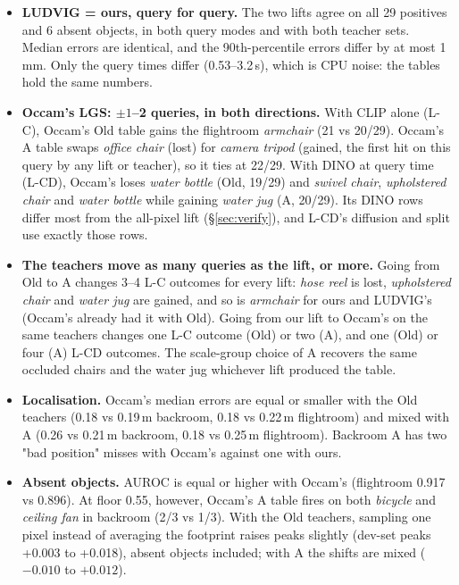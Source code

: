 \begin{itemize}[leftmargin=*,itemsep=2pt]
  \item \textbf{LUDVIG = ours, query for query.} The two lifts agree on all 29 positives and 6 absent objects, in both
        query modes and with both teacher sets. Median errors are identical, and the 90th-percentile errors differ by
        at most 1\,mm. Only the query times differ (0.53--3.2\,s), which is CPU noise: the tables hold the same numbers.
  \item \textbf{Occam's LGS: $\pm1$--2 queries, in both directions.} With CLIP alone (L-C), Occam's Old table gains the
        flightroom \emph{armchair} (21 vs 20/29). Occam's A table swaps \emph{office chair} (lost) for \emph{camera tripod}
        (gained, the first hit on this query by any lift or teacher), so it ties at 22/29. With DINO at query time
        (L-CD), Occam's loses \emph{water bottle} (Old, 19/29) and \emph{swivel chair}, \emph{upholstered chair} and
        \emph{water bottle} while gaining \emph{water jug} (A, 20/29). Its DINO rows differ most from the all-pixel
        lift (\S\ref{sec:verify}), and L-CD's diffusion and split use exactly those rows.
  \item \textbf{The teachers move as many queries as the lift, or more.} Going from Old to A changes 3--4 L-C outcomes
        for every lift: \emph{hose reel} is lost, \emph{upholstered chair} and \emph{water jug} are gained, and so is
        \emph{armchair} for ours and LUDVIG's (Occam's already had it with Old). Going from our lift to Occam's on the same
        teachers changes one L-C outcome (Old) or two (A), and one (Old) or four (A) L-CD outcomes. The scale-group
        choice of A recovers the same occluded chairs and the water jug whichever lift produced the table.
  \item \textbf{Localisation.} Occam's median errors are equal or smaller with the Old teachers (0.18 vs 0.19\,m
        backroom, 0.18 vs 0.22\,m flightroom) and mixed with A (0.26 vs 0.21\,m backroom, 0.18 vs 0.25\,m flightroom).
        Backroom A has two "bad position" misses with Occam's against one with ours.
  \item \textbf{Absent objects.} AUROC is equal or higher with Occam's (flightroom 0.917 vs 0.896). At floor 0.55,
        however, Occam's A table fires on both \emph{bicycle} and \emph{ceiling fan} in backroom (2/3 vs 1/3). With the Old
        teachers, sampling one pixel instead of averaging the footprint raises peaks slightly (dev-set peaks +0.003 to
        +0.018), absent objects included; with A the shifts are mixed ($-0.010$ to $+0.012$).
\end{itemize}
